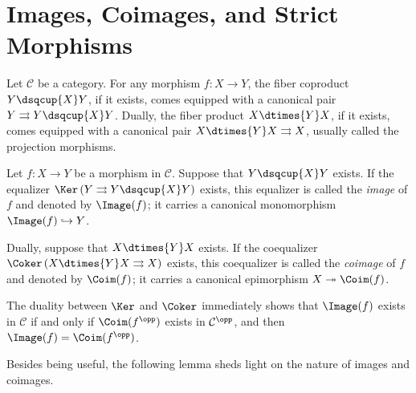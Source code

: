 
\section{Images, Coimages, and Strict Morphisms}\label{sec:images}
\hypertarget{o014.aljabr2.chapter1.images-coimages-strict}{ }

Let $\mathcal C$ be a category. For any morphism $f:X\to Y$, the fiber coproduct $Y\dsqcup{X}Y$, if it exists, comes equipped with a canonical pair $Y\rightrightarrows Y\dsqcup{X}Y$. Dually, the fiber product $X\dtimes{Y}X$, if it exists, comes equipped with a canonical pair $X\dtimes{Y}X\rightrightarrows X$, usually called the projection morphisms.

\begin{definition}\label{def:Im-Coim}
	 
	 
	Let $f:X\to Y$ be a morphism in $\mathcal C$. Suppose that $Y\dsqcup{X}Y$ exists. If the equalizer $\Ker\left(Y\rightrightarrows Y\dsqcup{X}Y\right)$ exists, this equalizer is called the \emph{image} of $f$ and denoted by $\Image(f)$; it carries a canonical monomorphism $\Image(f)\hookrightarrow Y$.

	Dually, suppose that $X\dtimes{Y}X$ exists. If the coequalizer $\Coker\left(X\dtimes{Y}X\rightrightarrows X\right)$ exists, this coequalizer is called the \emph{coimage} of $f$ and denoted by $\Coim(f)$; it carries a canonical epimorphism $X\twoheadrightarrow\Coim(f)$.
\end{definition}

\begin{remark}\label{rem:im-coim-duality}
	The duality between $\Ker$ and $\Coker$ immediately shows that $\Image(f)$ exists in $\mathcal C$ if and only if $\Coim(f^{\opp})$ exists in $\mathcal C^{\opp}$, and then $\Image(f)=\Coim(f^{\opp})$.
\end{remark}

Besides being useful, the following lemma sheds light on the nature of images and coimages.

